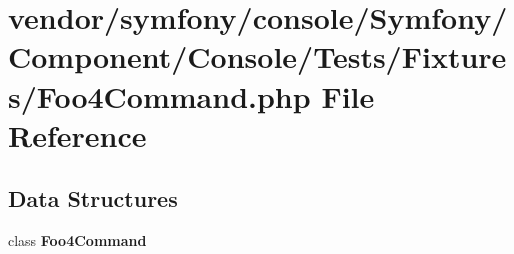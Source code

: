 \section{vendor/symfony/console/\+Symfony/\+Component/\+Console/\+Tests/\+Fixtures/\+Foo4\+Command.php File Reference}
\label{_foo4_command_8php}
\subsection*{Data Structures}
\begin{DoxyCompactItemize}
\item 
class {\bf Foo4\+Command}
\end{DoxyCompactItemize}
